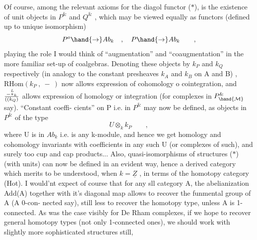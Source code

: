 Of course,  among the relevant axioms for the diagol functor ($\ast$),
is the existence of unit objects in $P^{\&}$ and $Q^{\&}$ ,  which may be viewed
equally as  functors (defined up to unique isomorphism)
\[ P^{o}\hand{\to} Ab_k \quad , \quad P\hand{\to} Ab_k \qquad , \]
playing the role I would think of ``augmentation'' and ``coaugmentation''
in the more familiar set-up of  coalgebras.  Denoting these objects by
$k_P$  and $k_Q$  respectively (in analogy to the constant presheaves $k_A$  and
$k_B$ on A and B) ,   $\mathrm{RHom}(k_P\ ,\ -\ )$  now allows expression of
cohomology o cointegration,  and  $-\overset{L}{\ast}_k\over{(}{(}k_Q)$  allows expression of
homology or integration (for complexes in $P^{\&}_{\hand{\mathcal{M}}}$ say).  ``Constant coeffi-%
cients''  on P i.e. in $P^{\&}$ may now be defined,  as objects in $P^{\&}$ of the
type
\[ U\otimes_k k_P \qquad , \]
where U is in $Ab_k$  i.e. is any k-module,  and hence we get homology and
cohomology invariants with coefficients in any such U (or complexes of
such),  and surely too cup and cap products... Also,  quasi-isomorphisms
of structures ($\ast$)  (with units)  can now be defined in an evident way,
hence a derived category which merits to be understood,  when $k=\underline{Z}$ , in
terms of the homotopy category (Hot).  I would'nt expect of course
that for any sll category A,  the abelianization Add(A) together with
it's diagonal map allows to recover the funmental group of A (A 0-con-%
nected say),  still less to recover the homotopy type, unless A is
1-connected.  As was the case visibly for De Rham complexes,  if we
hope to recover general homotopy types (not only 1-connected ones), we
should  work with slightly more sophisticated structures still,

